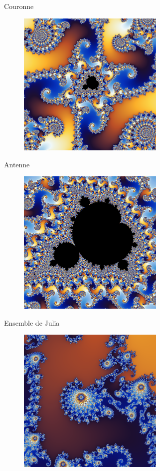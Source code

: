 \documentclass{beamer}
\begin{document}
\begin{frame}{Couronne}
\begin{figure}[H]
  \centering
  \includegraphics[width=70mm]{couronne.png}
 \end{figure}
\end{frame}

\begin{frame}{Antenne}
\begin{figure}[H]
  \centering
  \includegraphics[width=70mm]{antenne.png}
 \end{figure}
\end{frame}

\begin{frame}{Ensemble de Julia}
\begin{figure}[H]
  \centering
  \includegraphics[width=70mm]{julia.png}
 \end{figure}
\end{frame}
\end{document}
